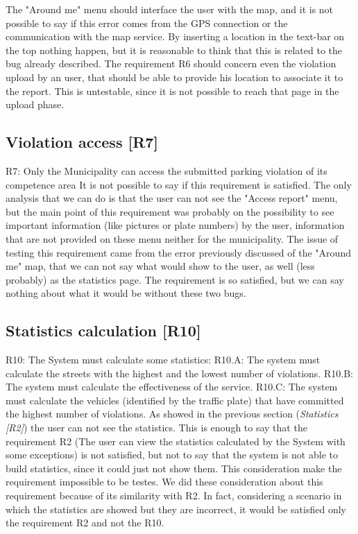 \documentclass[../ATD.tex]{subfiles}
\begin{document}
    The "Around me" menu should interface the user with the map, and it is not possible to say if this error comes from the GPS connection or the communication with the map service.
    By inserting a location in the text-bar on the top nothing happen, but it is reasonable to think that this is related to the bug already described.
    \newline
    The requirement R6 should concern even the violation upload by an user, that should be able to provide his location to associate it to the report.
    This is untestable, since it is not possible to reach that page in the upload phase.

    \subsection{Violation access [R7]}\label{subsec:violation-access}
    R7: Only the Municipality can access the submitted parking violation of its competence area
    \newline
    It is not possible to say if this requirement is satisfied.
    The only analysis that we can do is that the user can not see the "Access report" menu, but the main point of this requirement was probably on the possibility to see important information (like pictures or plate numbers) by the user, information that are not provided on these menu neither for the municipality.
    The issue of testing this requirement came from the error previously discussed of the "Around me" map, that we can not say what would show to the user, as well (less probably) as the statistics page.
    The requirement is so satisfied, but we can say nothing about what it would be without these two bugs.

    \subsection{Statistics calculation [R10]}\label{subsec:statistics-calculation}
    R10: The System must calculate some statistics:
    \newline
    R10.A: The system must calculate the streets with the highest and the lowest number of violations.
    \newline
    R10.B: The system must calculate the effectiveness of the service.
    \newline
    R10.C: The system must calculate the vehicles (identified by the traffic plate) that have committed the highest number of violations.
    \newline
    As showed in the previous section (\textit{Statistics [R2]}) the user can not see the statistics.
    This is enough to say that the requirement R2 (The user can view the statistics calculated by the System with some exceptions) is not satisfied, but not to say that the system is not able to build statistics, since it could just not show them.
    This consideration make the requirement impossible to be testes.
    \newline
    We did these consideration about this requirement because of its similarity with R2.
    In fact, considering a scenario in which the statistics are showed but they are incorrect, it would be satisfied only the requirement R2 and not the R10.
\end{document}
